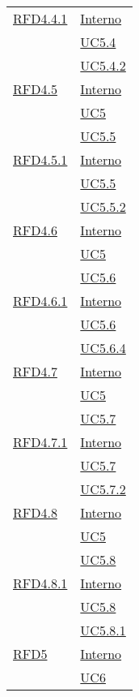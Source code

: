 \begin{longtable}{|>{\centering}m{5cm}|m{5cm}<{\centering}|}
\hyperlink{RFD4.4.1}{RFD4.4.1} & \hyperlink{Interno}{Interno}\\
& \hyperref[UC5.4]{UC5.4}\\
& \hyperref[UC5.4.2]{UC5.4.2}\\ \hline

\hyperlink{RFD4.5}{RFD4.5} & \hyperlink{Interno}{Interno}\\
& \hyperref[UC5]{UC5}\\
& \hyperref[UC5.5]{UC5.5}\\ \hline

\hyperlink{RFD4.5.1}{RFD4.5.1} & \hyperlink{Interno}{Interno}\\
& \hyperref[UC5.5]{UC5.5}\\
& \hyperref[UC5.5.2]{UC5.5.2}\\ \hline

\hyperlink{RFD4.6}{RFD4.6} & \hyperlink{Interno}{Interno}\\
& \hyperref[UC5]{UC5}\\
& \hyperref[UC5.6]{UC5.6}\\ \hline

\hyperlink{RFD4.6.1}{RFD4.6.1} & \hyperlink{Interno}{Interno}\\
& \hyperref[UC5.6]{UC5.6}\\
& \hyperref[UC5.6.4]{UC5.6.4}\\ \hline

\hyperlink{RFD4.7}{RFD4.7} & \hyperlink{Interno}{Interno}\\
& \hyperref[UC5]{UC5}\\
& \hyperref[UC5.7]{UC5.7}\\ \hline

\hyperlink{RFD4.7.1}{RFD4.7.1} & \hyperlink{Interno}{Interno}\\
& \hyperref[UC5.7]{UC5.7}\\
& \hyperref[UC5.7.2]{UC5.7.2}\\ \hline

\hyperlink{RFD4.8}{RFD4.8} & \hyperlink{Interno}{Interno}\\
& \hyperref[UC5]{UC5}\\
& \hyperref[UC5.8]{UC5.8}\\ \hline

\hyperlink{RFD4.8.1}{RFD4.8.1} & \hyperlink{Interno}{Interno}\\
& \hyperref[UC5.8]{UC5.8}\\
& \hyperref[UC5.8.1]{UC5.8.1}\\ \hline

\hyperlink{RFD5}{RFD5} & \hyperlink{Interno}{Interno}\\
& \hyperref[UC6]{UC6}\\ \hline


\end{longtable}
